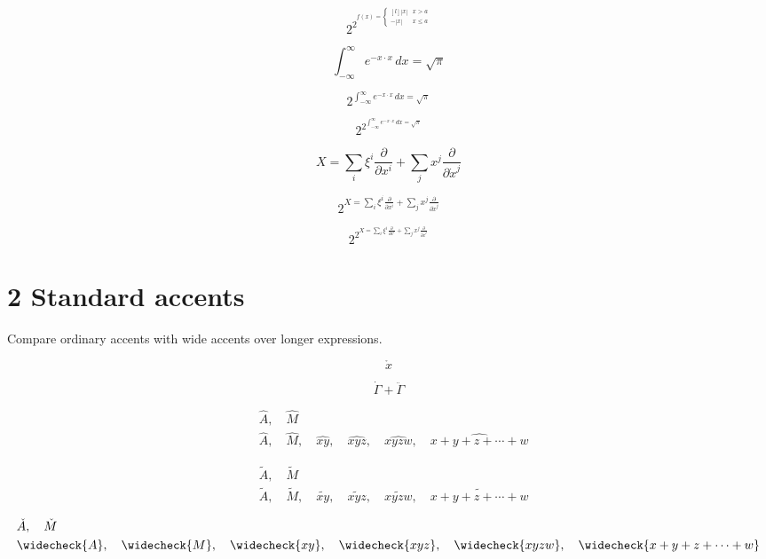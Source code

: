 \documentclass[a4paper,10pt]{article}
\begin{document}
\[
2^{2^{f(x)=\left\{
\begin{smallmatrix*}[l]
  \scriptscriptstyle |x|  & \scriptscriptstyle x>a \\
  \scriptscriptstyle -|x| & \scriptscriptstyle x\le a
\end{smallmatrix*}\right.}}
\]

\[
\int_{-\infty}^\infty e^{-x\cdot x}\,dx =\sqrt\pi
\]

\[
2^{\int_{-\infty}^\infty e^{-x\cdot x}\,dx =\sqrt\pi}
\]

\[
2^{2^{\int_{-\infty}^\infty e^{-x\cdot x}\,dx =\sqrt\pi}}
\]

\[
X=\sum_i\xi^i\frac{\partial}{\partial x^i}+\sum_j x^j\frac{\partial}{\partial\dot{x}^j}
\]

\[
2^{X=\sum_i\xi^i\frac{\partial}{\partial x^i}+\sum_j x^j\frac{\partial}{\partial\dot{x}^j}}
\]

\[
2^{2^{X=\sum_i\xi^i\frac{\partial}{\partial x^i}+\sum_j x^j\frac{\partial}{\partial\dot{x}^j}}}
\]

\clearpage
\section*{2 Standard accents}
Compare ordinary accents with wide accents over longer expressions.

\[
\mathring{x}
\]

\[
\dot{\Gamma}+\ddot{\Gamma}
\]

\[
\begin{aligned}
 & \hat{A},\quad\hat{M} \\
 & \widehat{A},\quad\widehat{M},\quad\widehat{xy},\quad
   \widehat{xyz},\quad\widehat{xyzw},\quad\widehat{x+y+z+\cdots+w}
\end{aligned}
\]

\[
\begin{aligned}
 & \tilde{A},\quad\tilde{M} \\
 & \widetilde{A},\quad\widetilde{M},\quad\widetilde{xy},\quad
   \widetilde{xyz},\quad\widetilde{xyzw},\quad\widetilde{x+y+z+\cdots+w}
\end{aligned}
\]

\[
\begin{aligned}
 & \check{A},\quad\check{M} \\
 & \widecheck{A},\quad\widecheck{M},\quad\widecheck{xy},\quad
   \widecheck{xyz},\quad\widecheck{xyzw},\quad\widecheck{x+y+z+\cdots+w}
\end{aligned}
\]
\end{document}
